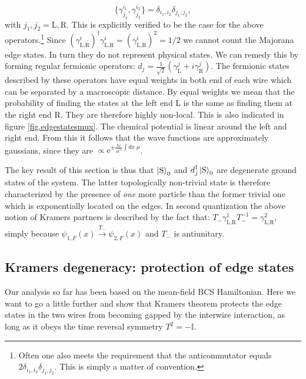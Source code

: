 \begin{equation}
\{\gamma^{i_1}_{j_1}, \gamma^{i_2}_{j_2} \} = \delta_{i_1,i_2}\delta_{j_1,j_2}, \nonumber
\end{equation}
with $j_1, j_2 = \text{L}, \text{R}$. This is explicitly verified to be the case for the above operators.\footnote{Often one also meets the requirement that the anticommutator equals $2\delta_{i_1,i_2}\delta_{j_1,j_2}$. This is simply a matter of convention.} Since $(\gamma^{i}_{\text{L,R}})^\dagger \gamma^{i}_{\text{L,R}} = (\gamma^{i}_{\text{L,R}})^2 = 1/2$ we cannot count the Majorana edge states. In turn they do not represent physical states. We can remedy this by forming regular fermionic operators: $d_j = \frac{1}{\sqrt{2}}(\gamma^{j}_{\text{L}} + i\gamma^{j}_{\text{R}})$. The fermionic states described by these operators have equal weights in both end of each wire which can be separated by a macroscopic distance. By equal weights we mean that the probability of finding the states at the left end L is the same as finding them at the right end R. They are therefore highly non-local. This is also indicated in figure \ref{fig.edgestatesmux}. The chemical potential is linear around the left and right end. From this it follows that the wave functions are approximately gaussians, since they are $\propto \text{e}^{\pm \frac{k_F}{\Delta^{11}}\int dx\; \mu}$. 

The key result of this section is thus that $\ket{\text{S}}_0$ and $d_j^\dagger\ket{\text{S}}_0$ are degenerate ground states of the system. The latter topologically non-trivial state is therefore characterized by the presence of \textit{one} more particle than the former trivial one which is exponentially located on the edges. In second quantization the above notion of Kramers partners is described by the fact that: $T_-\gamma^1_{\text{L,R}}T_-^{-1} = \gamma^2_{\text{L,R}}$, simply because $\psi_{1,F}(x) \overset{T_-}{\to} \psi_{2,F}(x)$ and $T_-$ is antiunitary.

\subsection{Kramers degeneracy: protection of edge states}
\label{sec.2wireskramersdegeneracy}
Our analysis so far has been based on the mean-field BCS Hamiltonian. Here we want to go a little further and show that Kramers theorem protects the edge states in the two wires from becoming gapped by the interwire interaction, as long as it obeys the time reversal symmetry $T^2 = -\mathbb{I}$. 

